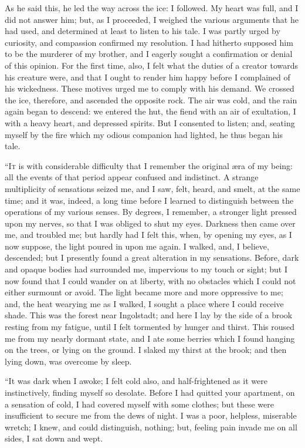 As he said this, he led the way across
the ice: I followed. My heart was
full, and I did not answer him; but,
as I proceeded, I weighed the various
arguments that he had used, and determined
at least to listen to his tale. I
was partly urged by curiosity, and
compassion confirmed my resolution.
I had hitherto supposed him to be the
murderer of my brother, and I eagerly
sought a confirmation or denial of
this opinion. For the first time, also,
I felt what the duties of a creator towards
his creature were, and that I
ought to render him happy before I
complained of his wickedness. These
motives urged me to comply with his
demand. We crossed the ice, therefore,
and ascended the opposite rock.
The air was cold, and the rain again
began to descend: we entered the hut,
the fiend with an air of exultation, I
with a heavy heart, and depressed spirits.
But I consented to listen; and,
seating myself by the fire which my
odious companion had lighted, he thus
began his tale.


``\textsc{It} is with considerable difficulty that
I remember the original æra of my being:
all the events of that period appear
confused and indistinct. A strange multiplicity
of sensations seized me, and I
saw, felt, heard, and smelt, at the same
time; and it was, indeed, a long time before
I learned to distinguish between the
operations of my various senses. By
degrees, I remember, a stronger light
pressed upon my nerves, so that I was
obliged to shut my eyes. Darkness then
came over me, and troubled me; but
hardly had I felt this, when, by opening
my eyes, as I now suppose, the light
poured in upon me again. I walked,
and, I believe, descended; but I presently
found a great alteration in my
sensations. Before, dark and opaque
bodies had surrounded me, impervious
to my touch or sight; but I now found
that I could wander on at liberty, with
no obstacles which I could not either
surmount or avoid. The light became
more and more oppressive to me; and,
the heat wearying me as I walked, I
sought a place where I could receive
shade. This was the forest near Ingolstadt;
and here I lay by the side
of a brook resting from my fatigue,
until I felt tormented by hunger and
thirst. This roused me from my nearly
dormant state, and I ate some berries
which I found hanging on the trees, or
lying on the ground. I slaked my
thirst at the brook; and then lying
down, was overcome by sleep.

``It was dark when I awoke; I felt
cold also, and half-frightened as it were
instinctively, finding myself so desolate.
Before I had quitted your apartment,
on a sensation of cold, I had covered
myself with some clothes; but
these were insufficient to secure me
from the dews of night. I was a poor,
helpless, miserable wretch; I knew,
and could distinguish, nothing; but,
feeling pain invade me on all sides, I
sat down and wept.


